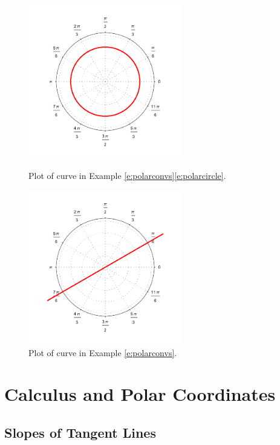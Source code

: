 \documentclass[letterpaper, 11pt, openany]{book}
\theoremstyle{mytheoremstyle}
\theoremstyle{myexamplestyle}
\begin{document}
\begin{figure}[htbp]
    \centering
    \begin{minipage}{0.45\textwidth}
        \centering
        \includegraphics[width=0.6\textwidth]{Figures/polarcircle.pdf}
        \caption{Plot of curve in Example \ref{e:polarconvs}\ref{e:polarcircle}.}
        \label{f:polarcircle}
    \end{minipage}\hfill
    \begin{minipage}{0.45\textwidth}
        \centering
        \includegraphics[width=0.6\textwidth]{Figures/polarthetaline.pdf}
        \caption{Plot of curve in Example \ref{e:polarconvs}.}
        \label{f:polarthetaline}
    \end{minipage}\hfill
\end{figure}

\section{Calculus and Polar Coordinates}
\setcounter{figure}{0}
\subsection{Slopes of Tangent Lines}
\end{document}
